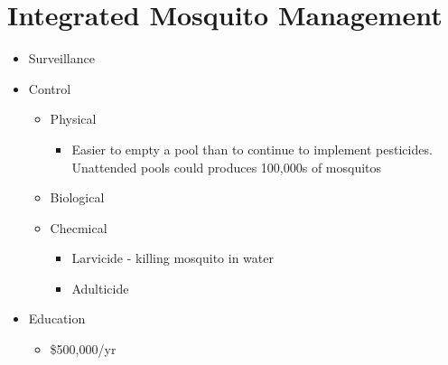 \documentclass{article}
\begin{document}
    \section{Integrated Mosquito Management}
    \begin{itemize}
        \item Surveillance
        \item Control
        \begin{itemize}
            \item Physical
            \begin{itemize}
                \item Easier to empty a pool than to continue to implement pesticides.  Unattended pools could produces 100,000s of mosquitos
            \end{itemize}
            \item Biological
            \item Checmical
            \begin{itemize}
                \item Larvicide - killing mosquito in water
                \item Adulticide
            \end{itemize}
        \end{itemize}
        \item Education
        \begin{itemize}
            \item \$500,000/yr
        \end{itemize}
    \end{itemize}
\end{document}
